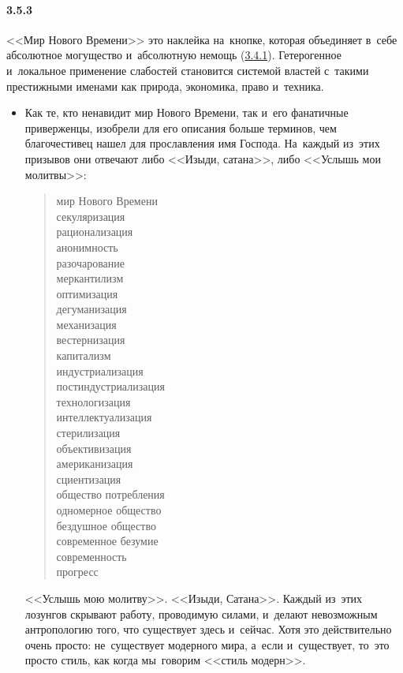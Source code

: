 \paragraph{3.5.3}\hypertarget{par:3.5.3}{} <<Мир Нового Времени>> это наклейка на~кнопке, которая объединяет в~себе абсолютное могущество и~абсолютную немощь (\hyperlink{par:3.4.1}{3.4.1}). Гетерогенное и~локальное применение слабостей становится системой властей с~такими престижными именами как природа, экономика, право и~техника.
	\begin{itemize}
	\item 
	Как те, кто ненавидит мир Нового Времени, так и~его фанатичные приверженцы, изобрели для его описания больше терминов, чем благочестивец нашел для прославления имя Господа. На~каждый из~этих призывов они отвечают либо <<Изыди, сатана>>, либо <<Услышь мои молитвы>>:

		\begin{verse}
		мир Нового Времени \\
		секуляризация  \\
		рационализация \\
		анонимность \\
		разочарование \\
		меркантилизм \\
		оптимизация \\
		дегуманизация \\
		механизация \\
		вестернизация \\
		капитализм \\
		индустриализация \\
		постиндустриализация \\
		технологизация \\
		интеллектуализация \\
		стерилизация \\
		объективизация \\
		американизация \\
		сциентизация \\
		общество потребления \\
		одномерное общество \\
		бездушное общество \\
		современное безумие \\
		современность \\
		прогресс
		\end{verse}

	<<Услышь мою молитву>>. <<Изыди, Сатана>>. Каждый из~этих лозунгов скрывают работу, проводимую силами, и~делают невозможным антропологию того, что существует здесь и~сейчас. Хотя это действительно очень просто: не~существует модерного мира, а~если и~существует, то~это просто стиль, как когда мы~говорим <<стиль модерн>>.
	\end{itemize}


